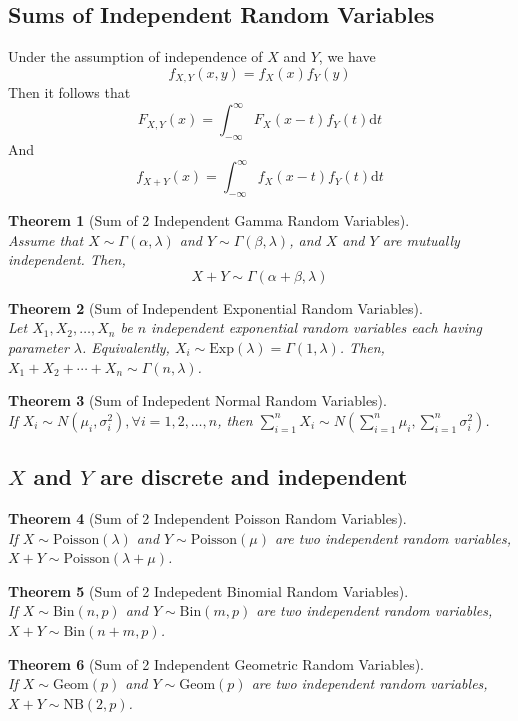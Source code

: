 \documentclass[12pt]{article}
\newcommand{\diff}{\mathrm{d}}
\newcommand{\bin}{\mathrm{Bin}}
\newcommand{\geom}{\mathrm{Geom}}
\newcommand{\Poi}{\mathrm{Poisson}}
\newcommand{\nb}{\mathrm{NB}}
\newcommand{\expo}{\mathrm{Exp}}
\newtheorem{theorem}{Theorem}[section]
\theoremstyle{definition}
\begin{document}
\subsection{Sums of Independent Random Variables}
Under the assumption of independence of $X$ and $Y$, we have
\[
f_{X,Y}(x,y) = f_X(x)f_Y(y)
\]
Then it follows that
\[
F_{X,Y}(x)=\int_{-\infty}^\infty F_X(x-t)f_Y(t)\diff t
\]
And
\[
f_{X+Y}(x)= \int_{-\infty}^\infty f_X(x-t)f_Y(t)\diff t
\]
\begin{theorem}[Sum of 2 Independent Gamma Random Variables]
\hfill\\\normalfont Assume that $X\sim\Gamma(\alpha, \lambda)$ and $Y\sim\Gamma(\beta,\lambda)$, and $X$ and $Y$ are mutually independent. Then,
\[
X+Y\sim\Gamma(\alpha+\beta, \lambda)
\]
\end{theorem}
\begin{theorem}[Sum of Independent Exponential Random Variables]
\hfill\\\normalfont Let $X_1, X_2,\ldots, X_n$ be $n$ independent exponential random variables each having parameter $\lambda$. Equivalently, $X_i\sim\expo(\lambda)=\Gamma(1,\lambda)$. Then, $X_1+X_2+\cdots+X_n\sim\Gamma(n,\lambda)$.
\end{theorem}
\begin{theorem}[Sum of Indepedent Normal Random Variables]
\hfill\\\normalfont If $X_i\sim N(\mu_i,\sigma_i^2),\forall i = 1, 2, \ldots, n$, then $\sum_{i=1}^nX_i\sim N(\sum_{i=1}^n\mu_i,\sum_{i=1}^n\sigma_i^2)$.
\end{theorem}
\subsection{$X$ and $Y$ are discrete and independent}
\begin{theorem}[Sum of 2 Independent Poisson Random Variables]
\hfill\\\normalfont If $X\sim\Poi(\lambda)$ and $Y\sim\Poi(\mu)$ are two independent random variables, $X+Y\sim\Poi(\lambda+\mu)$.
\end{theorem}
\begin{theorem}[Sum of 2 Indepedent Binomial Random Variables]
\hfill\\\normalfont If $X\sim\bin(n,p)$ and $Y\sim\bin(m,p)$ are two independent random variables, $X+Y\sim\bin(n+m,p)$.
\end{theorem}
\begin{theorem}[Sum of 2 Independent Geometric Random Variables]
\hfill\\\normalfont If $X\sim\geom(p)$ and $Y\sim\geom(p)$ are two independent random variables, $X+Y\sim\nb(2,p)$.
\end{theorem}
\end{document}
